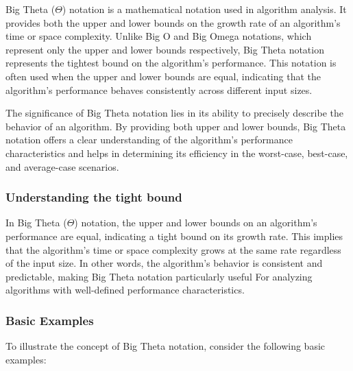 \documentclass[12pt]{book} %
\begin{document}
Big Theta (\(\Theta\)) notation is a mathematical notation used in algorithm analysis. It provides both the upper and lower bounds on the growth rate of an algorithm's time or space complexity. Unlike Big O and Big Omega notations, which represent only the upper and lower bounds respectively, Big Theta notation represents the tightest bound on the algorithm's performance. This notation is often used when the upper and lower bounds are equal, indicating that the algorithm's performance behaves consistently across different input sizes.

The significance of Big Theta notation lies in its ability to precisely describe the behavior of an algorithm. By providing both upper and lower bounds, Big Theta notation offers a clear understanding of the algorithm's performance characteristics and helps in determining its efficiency in the worst-case, best-case, and average-case scenarios.

\subsubsection{Understanding the tight bound}

In Big Theta (\(\Theta\)) notation, the upper and lower bounds on an algorithm's performance are equal, indicating a tight bound on its growth rate. This implies that the algorithm's time or space complexity grows at the same rate regardless of the input size. In other words, the algorithm's behavior is consistent and predictable, making Big Theta notation particularly useful For analyzing algorithms with well-defined performance characteristics.


\subsubsection{Basic Examples}

To illustrate the concept of Big Theta notation, consider the following basic examples:
\end{document}
